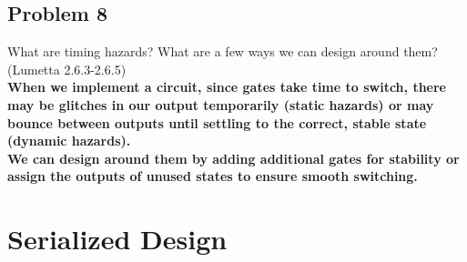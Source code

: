 \documentclass{article}
\begin{document}
\subsection*{Problem 8}
What are timing hazards? What are a few ways we can design around them? (Lumetta 2.6.3-2.6.5) \\
\textbf{When we implement a circuit, since gates take time to switch, there may be glitches in our output temporarily (static hazards) or may bounce between outputs until settling to the correct, stable state (dynamic hazards). \\ 
We can design around them by adding additional gates for stability or assign the outputs of unused states to ensure smooth switching.}

\newpage
\section*{Serialized Design}
\end{document}
